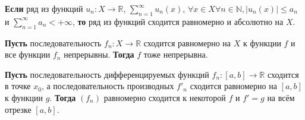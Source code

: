 \begin{to_thr}
\textbf{Если} ряд из функций $u_n : X \to \mathbb{R}$, $\sum_{n=1}^\infty u_n(x)$, $\forall x \in X \forall n \in \mathbb{N}, |u_n(x)| \leq a_n$ и $\sum_{n=1}^\infty a_n < + \infty $, \textbf{то} ряд из функций сходится равномерно и абсолютно на $X$.

\end{to_thr}


\begin{to_thr} 
    \textbf{Пусть} последовательность $f_n \colon X \to \mathbb{R}$ сходится равномерно на $X$ к функции $f$ и все функции $f_n$ непрерывны. \textbf{Тогда} $f$ тоже непрерывна.
\end{to_thr}

\begin{to_thr}
    \textbf{Пусть} последовательность дифференцируемых функций $f_n \colon [a, b] \to \mathbb{R}$ сходится в точке $x_0$, а последовательность производных $f'_n$ сходится равномерно на $[a, b]$ к функции $g$. \textbf{Тогда} $(f_n)$ равномерно сходится к некоторой $f$ и $f'=g$ на всём отрезке $[a, b]$.
\end{to_thr}     